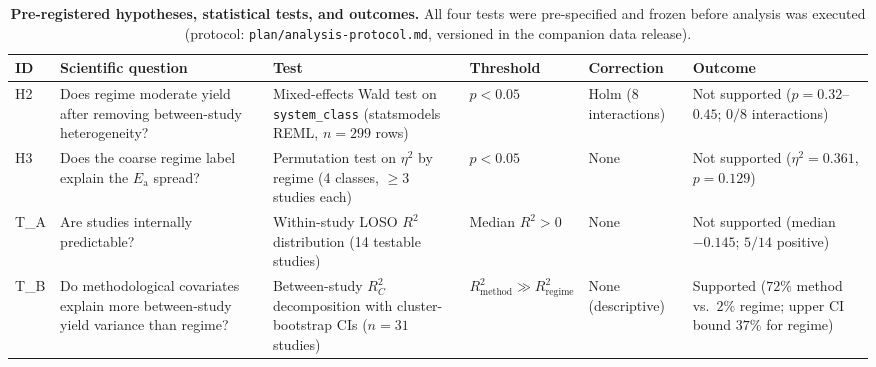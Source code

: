 \begin{table}[tbp]
\centering
\small
\caption{\textbf{Pre-registered hypotheses, statistical tests, and outcomes.}
All four tests were pre-specified and frozen before analysis was executed
(protocol: \texttt{plan/analysis-protocol.md}, versioned in the companion data release).}
\label{tab:prereg}
\begin{tabular}{p{0.7cm}p{2.6cm}p{2.8cm}p{1.6cm}p{1.2cm}p{2.4cm}}
\toprule
ID & Scientific question & Test & Threshold & Correction & Outcome \\
\midrule
H2 & Does regime moderate yield after removing between-study heterogeneity? &
  Mixed-effects Wald test on \texttt{system\_class} (statsmodels REML, $n\!=\!299$ rows) &
  $p < 0.05$ &
  Holm ($8$ interactions) &
  Not supported ($p\!=\!0.32$--$0.45$; $0/8$ interactions) \\[4pt]
H3 & Does the coarse regime label explain the $E_\mathrm{a}$ spread? &
  Permutation test on $\eta^2$ by regime (4 classes, $\ge\!3$ studies each) &
  $p < 0.05$ &
  None &
  Not supported ($\eta^2\!=\!0.361$, $p\!=\!0.129$) \\[4pt]
T\_A & Are studies internally predictable? &
  Within-study LOSO $R^2$ distribution (14 testable studies) &
  Median $R^2 > 0$ &
  None &
  Not supported (median $-0.145$; $5/14$ positive) \\[4pt]
T\_B & Do methodological covariates explain more between-study yield variance than regime? &
  Between-study $R^2_C$ decomposition with cluster-bootstrap CIs ($n\!=\!31$ studies) &
  $R^2_{\text{method}} \gg R^2_{\text{regime}}$ &
  None (descriptive) &
  Supported ($72\%$ method vs.\ $2\%$ regime; upper CI bound $37\%$ for regime) \\
\bottomrule
\end{tabular}
\end{table}
